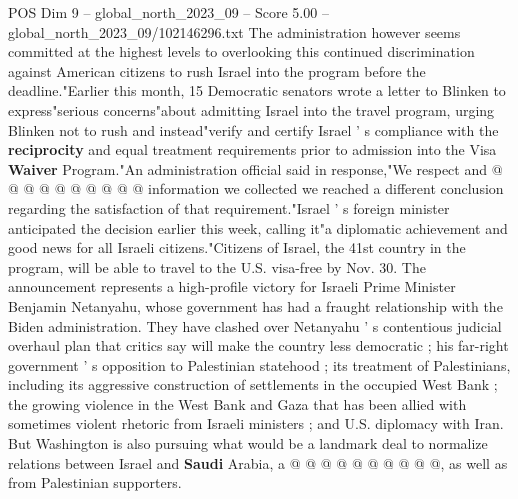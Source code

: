 \begin{textsample}{POS Dim 9 – global\_north\_2023\_09 – Score 5.00 – global\_north\_2023\_09/102146296.txt}
The administration however seems committed at the highest levels to overlooking this continued discrimination against American citizens to rush Israel into the program before the deadline."Earlier this month, 15 Democratic senators wrote a letter to Blinken to express"serious concerns"about admitting Israel into the travel program, urging Blinken not to rush and instead"verify and certify Israel ' s compliance with the \textbf{reciprocity} and equal treatment requirements prior to admission into the Visa \textbf{Waiver} Program."An administration official said in response,"We respect and @ @ @ @ @ @ @ @ @ @ information we collected we reached a different conclusion regarding the satisfaction of that requirement."Israel ' s foreign minister anticipated the decision earlier this week, calling it"a diplomatic achievement and good news for all Israeli citizens."Citizens of Israel, the 41st country in the program, will be able to travel to the U.S. visa-free by Nov. 30.
The announcement represents a high-profile victory for Israeli Prime Minister Benjamin Netanyahu, whose government has had a fraught relationship with the Biden administration.
They have clashed over Netanyahu ' s contentious judicial overhaul plan that critics say will make the country less democratic ; his far-right government ' s opposition to Palestinian statehood ; its treatment of Palestinians, including its aggressive construction of settlements in the occupied West Bank ; the growing violence in the West Bank and Gaza that has been allied with sometimes violent rhetoric from Israeli ministers ; and U.S. diplomacy with Iran.
But Washington is also pursuing what would be a landmark deal to normalize relations between Israel and \textbf{Saudi} Arabia, a @ @ @ @ @ @ @ @ @ @, as well as from Palestinian supporters.

\end{textsample}
